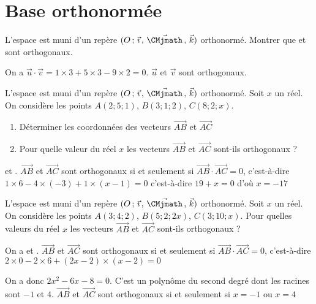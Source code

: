 \documentclass[11pt,fleqn, openany]{book} %
\begin{document}

\section*{Base orthonormée}



\begin{exercise}[topic=geom12]L'espace est muni d'un repère $\Oijk$ orthonormé. Montrer que  et  sont orthogonaux.\end{exercise}

\begin{solution}On a $\vec u \cdot \vec v = 1 \times 3 + 5 \times 3 - 9 \times 2 =0$. $\vec u$ et $\vec v$ sont orthogonaux.\end{solution}



\begin{exercise}[topic=geom12]L'espace est muni d'un repère $\Oijk$ orthonormé. Soit $x$ un réel. On considère les points $A(2;5;1)$, $B(3;1;2)$, $C(8;2;x)$. 

\begin{enumerate}
\item Déterminer les coordonnées des vecteurs $\overrightarrow{AB}$ et $\overrightarrow{AC}$
\item Pour quelle valeur du réel $x$ les vecteurs $\overrightarrow{AB}$ et $\overrightarrow{AC}$ sont-ils orthogonaux ?
\end{enumerate}
\end{exercise}

\begin{solution}  et . $\overrightarrow{AB}$ et $\overrightarrow{AC}$ sont orthogonaux si et seulement si $\overrightarrow{AB}\cdot \overrightarrow{AC}=0$, c'est-à-dire $1 \times 6 -4 \times (-3) + 1 \times (x-1)=0$ c'est-à-dire $19+x=0$ d'où $x=-17$\end{solution}




\begin{exercise}[topic=geom12]L'espace est muni d'un repère $\Oijk$ orthonormé. Soit $x$ un réel. On considère les points $A(3;4;2)$, $B(5;2;2x)$, $C(3;10;x)$. Pour quelles valeurs du réel $x$ les vecteurs $\overrightarrow{AB}$ et $\overrightarrow{AC}$ sont-ils orthogonaux ?\end{exercise}

\begin{solution}On a  et . $\overrightarrow{AB}$ et $\overrightarrow{AC}$ sont orthogonaux si et seulement si $\overrightarrow{AB}\cdot \overrightarrow{AC}=0$, c'est-à-dire $2 \times 0 -2\times 6 +(2x-2) \times (x-2)=0$

On a donc $2x^2-6x-8=0$. C'est un polynôme du second degré dont les racines sont $-1$ et $4$. $\overrightarrow{AB}$ et $\overrightarrow{AC}$ sont orthogonaux si et seulement si $x=-1$ ou $x=4$\end{solution}
\end{document}
